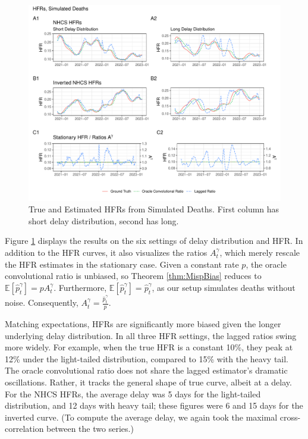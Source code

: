 \documentclass{article}
\begin{document}
\begin{figure}
    \centering
    \includegraphics[width=\linewidth]{Figs/Simulated/simulated_results.pdf}
    \caption{True and Estimated HFRs from Simulated Deaths. First column has short delay distribution, second has long.}
    \label{fig:sims}
\end{figure}

Figure \ref{fig:sims} displays the results on the six settings of delay distribution and HFR. In addition to the HFR curves, it also visualizes the ratios $A_t^\gamma$, which merely rescale the HFR estimates in the stationary case. Given a constant rate $p$, the oracle convolutional ratio is unbiased, so Theorem \ref{thm:MispBias} reduces to $\mathbb{E}[\hat{p}_t^\gamma] = p A_t^\gamma$. Furthermore, $\mathbb{E}[\hat{p}_t^\gamma] = \hat{p}_t^\gamma$, as our setup simulates deaths without noise. Consequently, $A_t^\gamma = \frac{\hat{p}_t^\gamma }{p}$. 


Matching expectations, HFRs are significantly more biased given the longer underlying delay distribution. 
In all three HFR settings, the lagged ratios swing more widely. For example, when the true HFR is a constant 10\%, they peak at 12\% under the light-tailed distribution, compared to 15\% with the heavy tail. The oracle convolutional ratio does not share the lagged estimator's dramatic oscillations. Rather, it tracks the general shape of true curve, albeit at a delay. For the NHCS HFRs, the average delay was 5 days for the light-tailed distribution, and 12 days with heavy tail; these figures were 6 and 15 days for the inverted curve. (To compute the average delay, we again took the maximal cross-correlation between the two series.)
\end{document}
